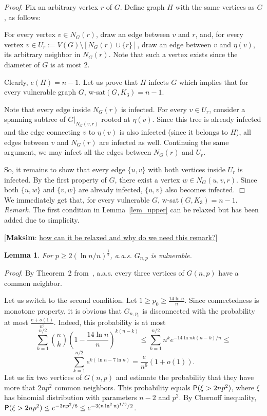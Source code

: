 \documentclass[]{article}
\newtheorem{lemma}[theorem]{Lemma}
\begin{document}
{\it Proof}. Fix an arbitrary vertex $r$ of $G$. Define graph $H$ with the same vertices as $G$, as follows:

For every vertex $v\in N_G(r)$, draw an edge between $v$ and $r$, and, for every vertex $v\in U_r:=V(G)\setminus [N_G(r)\cup\{r\}]$, draw an edge between $v$ and $\eta(v)$, its arbitrary neighbor in $N_G(r)$. Note that such a vertex exists since the diameter of $G$ is at most 2. 

Clearly, $e(H)=n-1$. Let us prove that $H$ infects $G$ which implies that for every vulnerable graph $G$, w-sat$(G,K_3)=n-1$. 

Note that every edge inside $N_G(r)$ is infected. For every $v \in U_r$, consider a spanning subtree of $G|_{N_G(v,r)}$ rooted at $\eta(v)$. Since this tree is already infected and the edge connecting $v$ to $\eta(v)$ is also infected (since it belongs to $H$), all edges between $v$ and $N_G(r)$ are infected as well. Continuing the same argument, we may infect all the edges between $N_G(r)$ and $U_r$.

So, it remains to show that every edge $\{u,v\}$ with both vertices inside $U_r$ is infected. By the first property of $G$, there exist a vertex $w \in N_G(u,v,r)$. Since both $\{u,w\}$ and $\{v,w\}$ are already infected, $\{u,v\}$ also becomes infected. $\Box$\\

We immediately get that, for every vulnerable $G$, w-sat$(G,K_3)=n-1$.\\


{\it Remark}. The first condition in Lemma~\ref{lem_upper} can be relaxed but has been added due to simplicity. 

[{\bf Maksim}: \underline{how can it be relaxed and why do we need this remark?}]


\begin{lemma}
	For $p\geq 2(\ln n/n)^{\frac 13}$, a.a.s. $G_{n,p}$ is vulnerable.
\end{lemma}

{\it Proof}. By Theorem~2 from~\cite{Spencer_extensions}, a.a.s. every three vertices of $G(n,p)$ have a common neighbor.

Let us switch to the second condition. Let $1\geq p_0\geq\frac{14\ln n}{n}$. Since connectedness is monotone property, it is obvious that $G_{n,p_0}$ is disconnected with the probability at most $\frac{e+o(1)}{n^6}$. Indeed, this probability is at most
$$
\sum_{k=1}^{n/2}{n\choose k}\left(1-\frac{14\ln n}{n}\right)^{k(n-k)}\leq \sum_{k=1}^{n/2} n^k e^{-14\ln n k(n-k)/n}\leq
$$
$$
\sum_{k=1}^{n/2} e^{k(\ln n-7\ln n)}=\frac{e}{n^6}(1+o(1)).
$$
Let us fix two vertices of $G(n,p)$ and estimate the probability that they have more that $2np^2$ common neighbors. This probability equals ${\sf P}(\xi>2np^2)$, where $\xi$ has binomial distribution with parameters $n-2$ and $p^2$. By Chernoff inequality, ${\sf P}(\xi>2np^2)\leq e^{-3np^2/8}\leq e^{-3(n\ln^2 n)^{1/3}/2}$.
\end{document}
